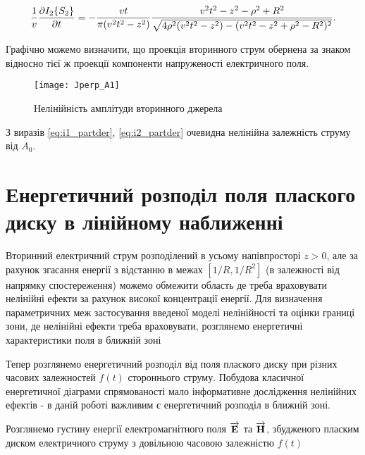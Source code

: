 %
\begin{equation} \begin{aligned} \label{eq:i2_partder}
\frac{1}{v} \frac{\partial  I_2 \{ S_2 \} }{\partial t} = 
- \frac{vt}{\pi (v^2t^2 - z^2) } \frac{ v^2t^2 - z^2 - \rho^2 + R^2 } 
{ \sqrt{ 4 \rho^2 (v^2t^2 - z^2) - (v^2t^2 - z^2 + \rho^2 - R^2)^2 } }.
\end{aligned} \end{equation}

Графічно можемо визначити, що проекція вторинного струм обернена за знаком 
відносно тієї ж проекції компоненти напруженості електричного поля.

\begin{figure}[h] \begin{center}
\texttt{[image: Jperp\_A1]}
\caption{Нелінійність амплітуди вторинного джерела}
\label{fig:jx_secondary}
\end{center} \end{figure}

З виразів \eqref{eq:i1_partder}, \eqref{eq:i2_partder} очевидна нелінійна 
залежність струму від $ A_0 $.

\section{Енергетичний розподіл поля плаского диску в лінійному наближенні}

Вторинний електричний струм розподілений в усьому напівпросторі $ z > 0 $,
але за рахунок згасання енергії з відстанню в межах $ [1/R, 1/R^2] $ (в 
залежності від напрямку спостереження) можемо обмежити область де треба 
враховувати нелінійні ефекти за рахунок високої концентрації енергії. Для 
визначення параметричних меж застосування введеної моделі нелінійності та 
оцінки границі зони, де нелінійні ефекти треба враховувати, розглянемо 
енергетичні характеристики поля в ближній зоні

Тепер розглянемо енергетичний розподіл від поля плаского диску при різних
часових залежностей $ f(t) $ стороннього струму. Побудова класичної 
енергетичної діаграми спрямованості мало інформативне дослідження нелінійних
ефектів - в даній роботі важливим є енергетичний розподіл в ближній зоні.

Розглянемо густину енергії електромагнітного поля $ \overrightarrow{\mathbf E} $ та 
$ \overrightarrow{\mathbf H} $, збудженого пласким диском електричного струму з довільною 
часовою залежністю $ f(t) $

